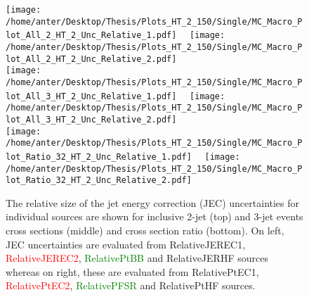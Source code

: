 \begin{figure}[!hbtp]
\hspace*{-5mm}\texttt{[image: /home/anter/Desktop/Thesis/Plots\_HT\_2\_150/Single/MC\_Macro\_Plot\_All\_2\_HT\_2\_Unc\_Relative\_1.pdf]}%
~~\texttt{[image: /home/anter/Desktop/Thesis/Plots\_HT\_2\_150/Single/MC\_Macro\_Plot\_All\_2\_HT\_2\_Unc\_Relative\_2.pdf]}\\
\hspace*{-5mm}\texttt{[image: /home/anter/Desktop/Thesis/Plots\_HT\_2\_150/Single/MC\_Macro\_Plot\_All\_3\_HT\_2\_Unc\_Relative\_1.pdf]}%
~~\texttt{[image: /home/anter/Desktop/Thesis/Plots\_HT\_2\_150/Single/MC\_Macro\_Plot\_All\_3\_HT\_2\_Unc\_Relative\_2.pdf]}\\
\hspace*{-5mm}\texttt{[image: /home/anter/Desktop/Thesis/Plots\_HT\_2\_150/Single/MC\_Macro\_Plot\_Ratio\_32\_HT\_2\_Unc\_Relative\_1.pdf]}%
~~\texttt{[image: /home/anter/Desktop/Thesis/Plots\_HT\_2\_150/Single/MC\_Macro\_Plot\_Ratio\_32\_HT\_2\_Unc\_Relative\_2.pdf]}\\
\caption{The relative size of the jet energy correction (JEC) uncertainties for individual sources are shown for inclusive 2-jet (top) and 3-jet events cross sections (middle) and cross section ratio \ratio (bottom). On left, JEC uncertainties are evaluated from \textcolor{blue2}{RelativeJEREC1}, \textcolor{red}{RelativeJEREC2}, \textcolor{green}{RelativePtBB} and \textcolor{pink2}{RelativeJERHF} sources whereas on right, these are evaluated from \textcolor{blue2}{RelativePtEC1}, \textcolor{red}{RelativePtEC2}, \textcolor{green}{RelativePFSR} and \textcolor{pink2}{RelativePtHF} sources.}
\label{fig:jes2}
\end{figure}

